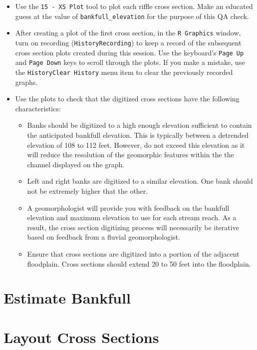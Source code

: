 \documentclass[]{book}
\providecommand{\tightlist}{%
  \setlength{\itemsep}{0pt}\setlength{\parskip}{0pt}}
\theoremstyle{definition}
\theoremstyle{definition}
\theoremstyle{definition}
\theoremstyle{remark}
\begin{document}
\begin{itemize}
\tightlist
\item
  Use the \texttt{15\ -\ XS\ Plot} tool to plot each riffle cross
  section. Make an educated guess at the value of
  \texttt{bankfull\_elevation} for the purpose of this QA check.
\item
  After creating a plot of the first cross section, in the
  \texttt{R\ Graphics} window, turn on recording
  (\texttt{History\textbar{}Recording}) to keep a record of the
  subsequent cross section plots created during this session. Use the
  keyboard's \texttt{Page\ Up} and \texttt{Page\ Down} keys to scroll
  through the plots. If you make a mistake, use the
  \texttt{History\textbar{}Clear\ History} menu item to clear the
  previously recorded graphs.
\item
  Use the plots to check that the digitized cross sections have the
  following characteristics:

  \begin{itemize}
  \tightlist
  \item
    Banks should be digitized to a high enough elevation sufficient to
    contain the anticipated bankfull elevation. This is typically
    between a detrended elevation of 108 to 112 feet. However, do not
    exceed this elevation as it will reduce the resolution of the
    geomorphic features within the the channel displayed on the graph.
  \item
    Left and right banks are digitized to a similar elevation. One bank
    should not be extremely higher that the other.
  \item
    A geomorphologist will provide you with feedback on the bankfull
    elevation and maximum elevation to use for each stream reach. As a
    result, the cross section digitizing process will necessarily be
    iterative based on feedback from a fluvial geomorphologist.
  \item
    Ensure that cross sections are digitized into a portion of the
    adjacent floodplain. Cross sections should extend 20 to 50 feet into
    the floodplain.
  \end{itemize}
\end{itemize}

\section{Estimate Bankfull}\label{estimate-bankfull-1}

\section{Layout Cross Sections}\label{layout-cross-sections-1}
\end{document}
